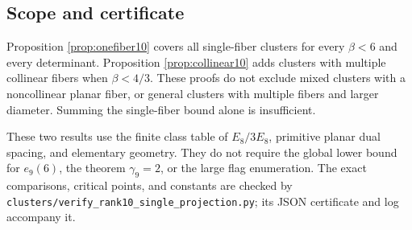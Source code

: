 \documentclass[11pt,a4paper]{article}
\theoremstyle{remark}\newtheorem{remark}[theorem]{Remark}
\newcommand{\file}[1]{{\small\nolinkurl{#1}}}
\begin{document}
\subsection{Scope and certificate}

Proposition \ref{prop:onefiber10} covers all single-fiber clusters for every $\beta<6$ and every determinant. Proposition \ref{prop:collinear10} adds clusters with multiple collinear fibers when $\beta<4/3$. These proofs do not exclude mixed clusters with a noncollinear planar fiber, or general clusters with multiple fibers and larger diameter. Summing the single-fiber bound alone is insufficient.

These two results use the finite class table of $E_8/3E_8$, primitive planar dual spacing, and elementary geometry. They do not require the global lower bound for $e_9(6)$, the theorem $\gamma_9=2$, or the large flag enumeration. The exact comparisons, critical points, and constants are checked by \file{clusters/verify_rank10_single_projection.py}; its JSON certificate and log accompany it.
\end{document}
